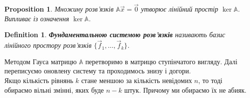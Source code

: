 \documentclass[a4paper, 10pt]{article}
\theoremstyle{theoremdd}
\newtheorem{definition}[theorem]{Definition}
\newtheorem{proposition}[theorem]{Proposition}
\begin{document}
\begin{proposition}
Множину розв'язків $\mathbb{A} \vec{x} = \vec{0}$ утворює лінійний простір $\ker { \mathbb{A}}$.\\
\textit{Випливає із означення $\ker { \mathbb{A}}$.}
\end{proposition}

\begin{definition}
\textbf{Фундаментальною системою розв'язків} називають базис лінійного простору розв'язків $\{\vec{f}_1,\dots,\vec{f}_k\}$.
\end{definition}
\noindent
Методом Гауса матрицю $\mathbb{A}$ перетворимо в матрицю ступінчатого вигляду. Далі переписуємо оновлену систему та проходимось знизу і догори.\\
Якщо кількість рівнянь $k$ стане меншою за кількість невідомих $n$, то тоді обираємо вільні змінні, яких буде $n-k$ штук. Причому ми обираємо їх не абияк.
\end{document}
